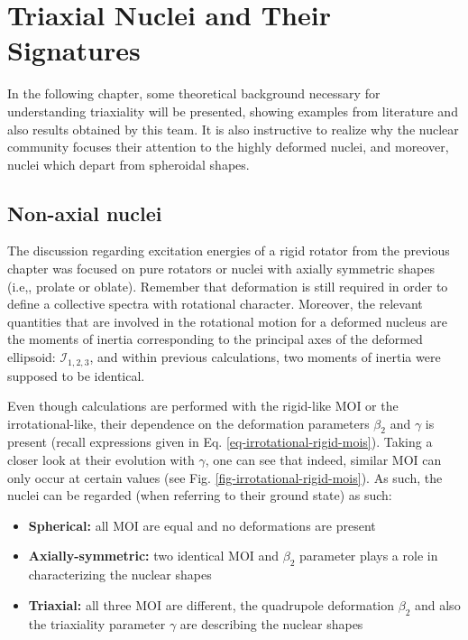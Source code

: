 \chapter{Triaxial Nuclei and Their Signatures}
\label{chapter4}

In the following chapter, some theoretical background necessary for understanding triaxiality will be presented, showing examples from literature and also results obtained by this team. It is also instructive to realize why the nuclear community focuses their attention to the highly deformed nuclei, and moreover, nuclei which depart from spheroidal shapes.

\section{Non-axial nuclei}

The discussion regarding excitation energies of a rigid rotator from the previous chapter was focused on pure rotators or nuclei with axially symmetric shapes (i.e,, prolate or oblate). Remember that deformation is still required in order to define a collective spectra with rotational character. Moreover, the relevant quantities that are involved in the rotational motion for a deformed nucleus are the moments of inertia corresponding to the principal axes of the deformed ellipsoid: $\mathcal{I}_{1,2,3}$, and within previous calculations, two moments of inertia were supposed to be identical.

Even though calculations are performed with the rigid-like MOI or the irrotational-like, their dependence on the deformation parameters $\beta_2$ and $\gamma$ is present (recall expressions given in Eq. \ref{eq-irrotational-rigid-mois}). Taking a closer look at their evolution with $\gamma$, one can see that indeed, similar MOI can only occur at certain values (see Fig. \ref{fig-irrotational-rigid-mois}). As such, the nuclei can be regarded (when referring to their ground state) as such:
\begin{itemize}
    \item \textbf{Spherical:} all MOI are equal and no deformations are present
    \item \textbf{Axially-symmetric:} two identical MOI and $\beta_2$ parameter plays a role in characterizing the nuclear shapes 
    \item \textbf{Triaxial:} all three MOI are different, the quadrupole deformation $\beta_2$ and also the triaxiality parameter $\gamma$ are describing the nuclear shapes
\end{itemize}

